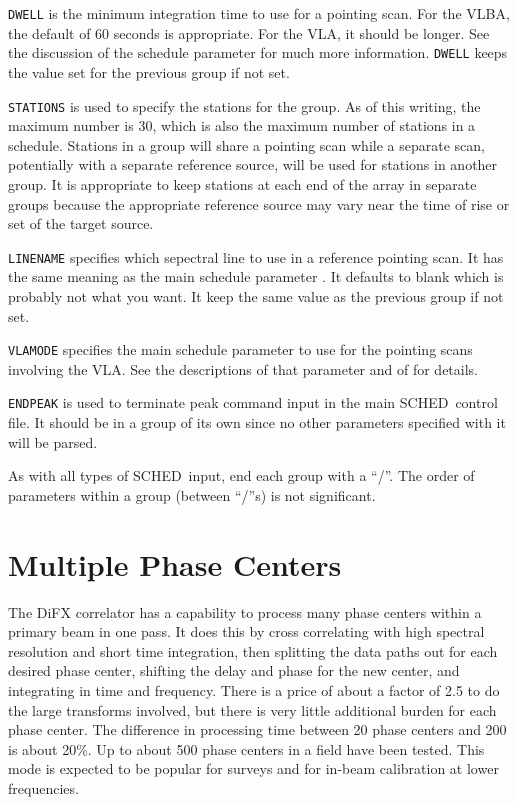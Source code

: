 \documentclass{report}
\newcommand{\schedb}{{\sc SCHED~}}
\begin{document}
\begin{list}{}{\parsep 0em  \itemsep 0em }
\item {\tt DWELL} is the minimum integration time to use for a pointing
scan.  For the VLBA, the default of 60 seconds is appropriate.  For the
VLA, it should be longer.  See the discussion of the schedule parameter
 for much more information.
{\tt DWELL} keeps the value set for the previous group if not set.

\item {\tt STATIONS} is used to specify the stations for the group.
As of this writing, the maximum number is 30, which is also the maximum
number of stations in a schedule.  Stations in a group will share a
pointing scan while a separate scan, potentially with a separate
reference source, will be used for stations in another group.  It
is appropriate to keep stations at each end of the array in separate
groups because the appropriate reference source may vary near
the time of rise or set of the target source.

\item {\tt LINENAME} specifies which sepectral line to use in a reference
pointing scan.  It has the same meaning as the main schedule parameter
.  It defaults to blank which is
probably not what you want.  It keep the same value as the previous
group if not set.

\item {\tt VLAMODE} specifies the main schedule parameter
 to use for the pointing scans
involving the VLA.  See the descriptions of that parameter and of
 for details.

\item {\tt ENDPEAK} is used to terminate peak command input in the
main \schedb control file.  It should be in a group of its own since
no other parameters specified with it will be parsed.

\end{list}

As with all types of \schedb input, end each group with a ``/''.  The
order of parameters within a group (between ``/''s) is not significant.

\section{\label{SEC:MULTIPLE_CENTERS}Multiple Phase Centers}

The DiFX correlator has a capability to process many phase centers
within a primary beam in one pass.  It does this by cross correlating
with high spectral resolution and short time integration, then
splitting the data paths out for each desired phase center, shifting
the delay and phase for the new center, and integrating in time and
frequency.  There is a price of about a factor of 2.5 to do the
large transforms involved, but there is very little additional burden
for each phase center.  The difference in processing time between 20
phase centers and 200 is about 20\%.  Up to about 500 phase centers in
a field have been tested.  This mode is expected to be popular for
surveys and for in-beam calibration at lower frequencies.
\end{document}
